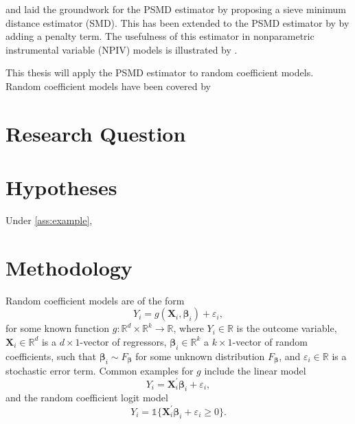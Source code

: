 \citet{AiChen2003} and \citet{NeweyPowell2003} laid the groundwork for the PSMD estimator by proposing a sieve minimum distance estimator (SMD). 
This has been extended to the PSMD estimator by \citet{ChenPouzo2012} by adding a penalty term. 
The usefulness of this estimator in nonparametric instrumental variable (NPIV) models is illustrated by \citet{ChenPouzo2015}.

This thesis will apply the PSMD estimator to random coefficient models.
Random coefficient models have been covered by

\section{Research Question}
\label{sec:researchquestion}

\lipsum[4]

\section{Hypotheses}
\label{sec:hypotheses}

\begin{assumption}
    \label{ass:example}
    \lipsum[5][1-2]
\end{assumption}

\begin{proposition}
    \label{prop:example}
    Under \cref{ass:example}, \lipsum[5][3-4]
\end{proposition}

\section{Methodology}
\label{sec:methodology}

Random coefficient models are of the form
\begin{equation}
\label{eq:rcgeneral}
    Y_i = g(\bm{X}_i, \bm{\beta}_i) + \varepsilon_i,
\end{equation}
for some known function $g: \mathbb{R}^d \times \mathbb{R}^k \to \mathbb{R}$, where $Y_i\in \mathbb{R}$ is the outcome variable, $\bm{X}_i\in \mathbb{R}^d$ is a $d\times 1$-vector of regressors, $\bm{\beta}_i \in \mathbb{R}^k$ a $k \times 1$-vector of random coefficients, such that $\bm{\beta}_i \sim F_{\bm{\beta}}$ for some unknown distribution $F_{\bm{\beta}}$, and $\varepsilon_i \in \mathbb{R}$ is a stochastic error term.
Common examples for $g$ include the linear model
\begin{equation}
\label{eq:rclinear}
    Y_i = \bm{X}_i^\prime \bm{\beta}_i + \varepsilon_i,
\end{equation}
and the random coefficient logit model
\begin{equation}
\label{eq:rclogit}
    Y_i = \mathds{1}\{\bm{X}_i^\prime \bm{\beta}_i + \varepsilon_i \geq 0\}.
\end{equation}

